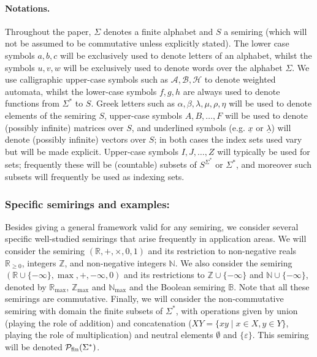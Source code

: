\documentclass[10pt,a4paper]{amsart}
\theoremstyle{definition}
\numberwithin{equation}{section}
\numberwithin{theorem}{section}
\begin{document}
\paragraph*{\textbf{Notations.}}
Throughout the paper, $\Sigma$ denotes a finite alphabet and $S$ a semiring (which will not be assumed to be commutative unless explicitly stated). The lower case symbols $a,b,c$ will be exclusively used to denote letters of an alphabet, whilst the symbols $u,v,w$ will be exclusively used to denote words over the alphabet $\Sigma$. We use calligraphic upper-case symbols such as $\mathcal{A}, \mathcal{B}, \mathcal{H}$ to denote weighted automata, whilst the lower-case symbols $f,g,h$ are always used to denote functions from $\Sigma^*$ to $S$.  Greek letters such as $\alpha, \beta, \lambda, \mu, \rho, \eta$ will be used to denote elements of the semiring $S$, upper-case symbols $A, B, \ldots, F$ will be used to denote (possibly infinite) matrices over $S$, and underlined symbols (e.g. $\underline{x}$ or $\underline{\lambda}$) will denote (possibly infinite) vectors over $S$; in both cases the index sets used  vary but will be made explicit. Upper-case symbols $I, J,\ldots, Z$ will typically be used for sets;  frequently these will be (countable) subsets of $S^{\Sigma^*}$ or $\Sigma^*$, and moreover such subsets will frequently be used as indexing sets.

\subsubsection*{\textbf{Specific semirings and examples:}} Besides giving a general framework valid for any semiring, we  consider several specific well-studied semirings that arise frequently in application areas.
We will consider the semiring $(\mathbb{R},+,\times,0,1)$ and its restriction to non-negative reals $\mathbb{R}_{\geq 0}$, integers $\mathbb{Z}$, and non-negative integers $\mathbb{N}$. We also consider the semiring $(\mathbb{R}\cup\{-\infty\},\max,+,-\infty,0)$ and its restrictions to $\mathbb{Z}\cup\{-\infty\}$ and $\mathbb{N}\cup\{-\infty\}$, denoted by $\mathbb{R}_{\max}$,  $\mathbb{Z}_{\max}$ and $\mathbb{N}_{\max}$ and the Boolean semiring $\mathbb{B}$. Note that all these semirings are commutative. Finally, we will consider the non-commutative semiring with domain the finite subsets of $\Sigma^*$, with operations given by union (playing the role of addition) and concatenation ($XY = \{xy \mid x\in X, y \in Y\}$, playing the role of multiplication) and neutral elements $\emptyset$ and $\{\varepsilon\}$. This semiring will be denoted $\mathcal{P}_{\rm fin}(\Sigma^*)$. 
\end{document}
